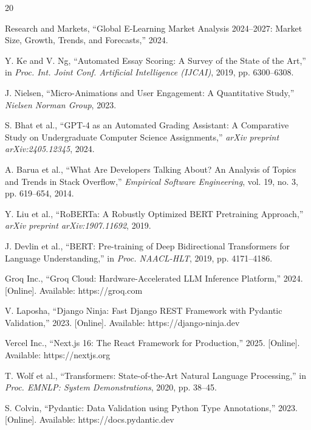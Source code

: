 \documentclass[conference]{IEEEtran}
\begin{document}
\begin{thebibliography}{20}

Research and Markets, ``Global E-Learning Market Analysis 2024--2027: Market Size, Growth, Trends, and Forecasts,'' 2024.

Y. Ke and V. Ng, ``Automated Essay Scoring: A Survey of the State of the Art,'' in \textit{Proc. Int. Joint Conf. Artificial Intelligence (IJCAI)}, 2019, pp. 6300--6308.

J. Nielsen, ``Micro-Animations and User Engagement: A Quantitative Study,'' \textit{Nielsen Norman Group}, 2023.

S. Bhat et al., ``GPT-4 as an Automated Grading Assistant: A Comparative Study on Undergraduate Computer Science Assignments,'' \textit{arXiv preprint arXiv:2405.12345}, 2024.

A. Barua et al., ``What Are Developers Talking About? An Analysis of Topics and Trends in Stack Overflow,'' \textit{Empirical Software Engineering}, vol. 19, no. 3, pp. 619--654, 2014.

Y. Liu et al., ``RoBERTa: A Robustly Optimized BERT Pretraining Approach,'' \textit{arXiv preprint arXiv:1907.11692}, 2019.

J. Devlin et al., ``BERT: Pre-training of Deep Bidirectional Transformers for Language Understanding,'' in \textit{Proc. NAACL-HLT}, 2019, pp. 4171--4186.

Groq Inc., ``Groq Cloud: Hardware-Accelerated LLM Inference Platform,'' 2024. [Online]. Available: https://groq.com

V. Laposha, ``Django Ninja: Fast Django REST Framework with Pydantic Validation,'' 2023. [Online]. Available: https://django-ninja.dev

Vercel Inc., ``Next.js 16: The React Framework for Production,'' 2025. [Online]. Available: https://nextjs.org

T. Wolf et al., ``Transformers: State-of-the-Art Natural Language Processing,'' in \textit{Proc. EMNLP: System Demonstrations}, 2020, pp. 38--45.

S. Colvin, ``Pydantic: Data Validation using Python Type Annotations,'' 2023. [Online]. Available: https://docs.pydantic.dev


\end{thebibliography}
\end{document}
